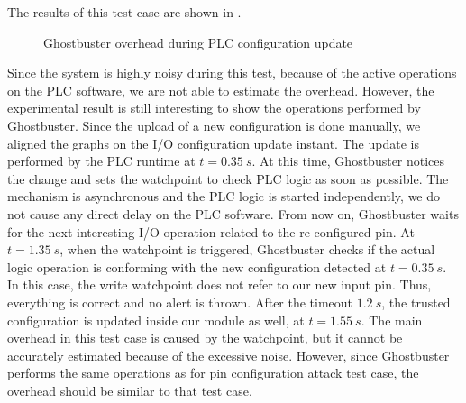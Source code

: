 The results of this test case are shown in .
\begin{figure}[t!]
\centering
{}
\caption{Ghostbuster overhead during PLC configuration update}
\label{fig:upload-overhead}
\end{figure}
Since the system is highly noisy during this test, because of the active operations on the PLC software, we are not able to estimate the overhead.
However, the experimental result is still interesting to show the operations performed by Ghostbuster.
Since the upload of a new configuration is done manually, we aligned the graphs on the I/O configuration update instant. The update is
performed by the PLC runtime at $t=\SI{0.35}{s}$. At this time, Ghostbuster notices the change and sets the watchpoint to check PLC logic as soon as possible.
The mechanism is asynchronous and the PLC logic is started independently, we do not cause any direct delay on the PLC software.
From now on, Ghostbuster waits for the next interesting I/O operation related to the re-configured pin.
At $t=\SI{1.35}{s}$, when the watchpoint is triggered, Ghostbuster checks if the actual logic operation is conforming with the new configuration detected at $t=\SI{0.35}{s}$.
In this case, the write watchpoint does not refer to our new input pin. Thus, everything is correct and no alert is thrown.
After the timeout $\SI{1.2}{s}$, the trusted configuration is updated inside our module as well, at $t=\SI{1.55}{s}$.
The main overhead in this test case is caused by the watchpoint, but it cannot be accurately estimated because of the excessive noise.
However, since Ghostbuster performs the same operations as for pin configuration attack test case, the overhead should be similar to that test case.
